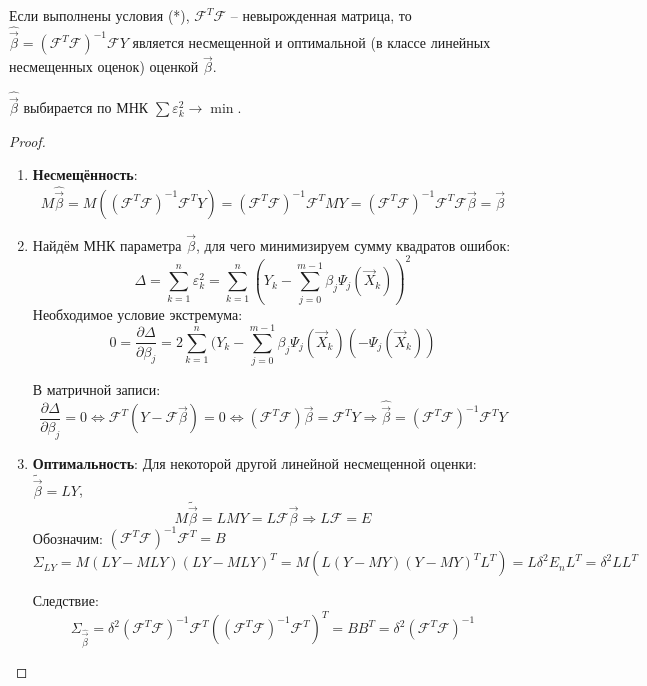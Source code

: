 \begin{theorem}
  Если выполнены условия (*), $\mathcal{F}^T \mathcal{F}$ -- невырожденная матрица, то
  $\hat{\vec{\beta}} = (\mathcal{F}^T \mathcal{F})^{-1} \mathcal{F} Y$ является несмещенной и оптимальной (в классе линейных несмещенных оценок) оценкой $\vec{\beta}$.
\end{theorem}
\begin{remark*}
$\hat{\vec{\beta}}$ выбирается по МНК $\sum \varepsilon_k^2 \to \min$.
\end{remark*}
\begin{proof}
  \begin{enumerate}
    \item \textbf{Несмещённость}:
      \[
        M \hat{\vec{\beta}} = M ( (\mathcal{F}^T \mathcal{F})^{-1} \mathcal{F}^T Y )
        = (\mathcal{F}^T \mathcal{F})^{-1} \mathcal{F}^T MY 
        =(\mathcal{F}^T \mathcal{F})^{-1} \mathcal{F}^T \mathcal{F} \vec{\beta}
        = \vec{\beta}
      \]

    \item Найдём МНК параметра $\vec{\beta}$, для чего минимизируем сумму квадратов ошибок: 
      \[ 
        \Delta = \sum_{k=1}^n \varepsilon_k^2
        = \sum_{k=1}^n (Y_k - \sum_{j=0}^{m-1} \beta_j \Psi_j (\vec{X}_k) )^2
      \] 
      Необходимое условие экстремума:
      \[
        0 = \frac{\partial \Delta}{\partial \beta_j}
        = 2 \sum_{k=1}^n (Y_k - \sum_{j=0}^{m-1} \beta_j \Psi_j(\vec{X}_k) (-\Psi_j (\vec{X}_k)) 
      \]

      В матричной записи:
      \[
        \frac{\partial \Delta}{\partial \beta_j} = 0
        \Leftrightarrow \mathcal{F}^T (Y - \mathcal{F} \vec{\beta}) = 0
        \Leftrightarrow 
        (\mathcal{F}^T \mathcal{F}) \vec{\beta} = \mathcal{F}^T Y
        \Rightarrow
        \hat{\vec{\beta}} = (\mathcal{F}^T \mathcal{F})^{-1} \mathcal{F}^T Y
      \]

    \item \textbf{Оптимальность}:
      Для некоторой другой линейной несмещенной оценки:
      $\tilde{\vec{\beta}} = L Y$,
      \[
        M \tilde{\vec{\beta}} = L MY = L \mathcal{F} \vec{\beta}
        \Rightarrow L \mathcal{F} = E
      \]
      Обозначим: $(\mathcal{F}^T \mathcal{F})^{-1} \mathcal{F}^T = B$
      \[
        \Sigma_{LY} = M(LY - MLY)(LY - MLY)^T = M( L(Y-MY)(Y-MY)^T L^T ) = L \delta^2 E_n L^T = \delta^2 L L^T
      \]

      Следствие: 
      \[
        \Sigma_{\hat{\vec{\beta}}} = \delta^2 (\mathcal{F}^T \mathcal{F})^{-1} \mathcal{F}^T ( (\mathcal{F}^T \mathcal{F})^{-1} \mathcal{F}^T )^T = B B^T = \delta^2 (\mathcal{F}^T \mathcal{F})^{-1} 
      \]


\end{enumerate}
\end{proof}
